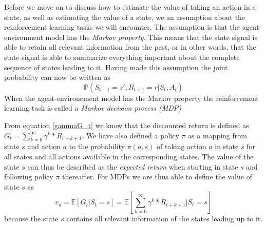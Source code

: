 \documentclass[11pt]{article}
\begin{document}
Before we move on to discuss how to estimate the value of taking an action in a state, as
well as estimating the value of a state, we an assumption about the reinforcement
learning tasks we will encounter.
The assumption is that the agent-environment model has the \textit{Markov property}.
This means that the state signal is able to retain all relevant information
from the past, or in other words, that the state signal is able to summarize
everything important about the complete sequence of states leading to it.
Having made this assumption the joint probability can now be written as
\begin{equation}
    \mathds{P}(S_{t+1} = s', R_{t+1} = r | S_t, A_t)
\end{equation}
When the agent-environement model has the Markov property the reinforcement
learning task is called a \textit{Markov decision process (MDP)}

From equation \ref{gammaG_t} we know that the discounted return
is defined as $G_t = \sum\limits_{k=0}^\infty \gamma^k * R_{t+k+1}$.
We have also defined a policy $\pi$ as a mapping from state $s$ and action $a$
to the probability $\pi(a, s)$ of taking action $a$ in state $s$ for all states
and all actions available in the corresponding states.
The value of the state $s$ can thus be described as the \textit{expected return}
when starting in state $s$ and following policy $\pi$ thereafter\cite{RLBook}.
For MDPs we are thus able to define the value of state $s$ as
\begin{equation}
    v_\pi = \mathds{E}[G_t | S_t = s] = \mathds{E}[\sum\limits_{k=0}^\infty \gamma^k * R_{t+k+1} | S_t = s]
\end{equation}
because the state $s$ contains all relevant information of the states leading up to it.


%
%
\end{document}
